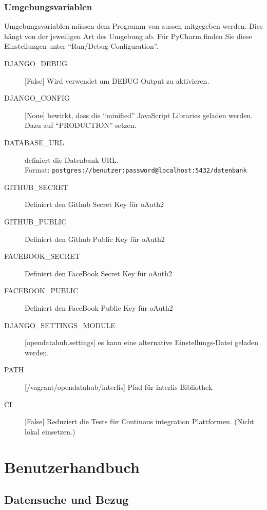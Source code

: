 \subsection{Umgebungsvariablen} \label{sec:sd:umgebungsvariablen}
Umgebungsvariablen müssen dem Programm von aussen mitgegeben werden. Dies hängt von der jeweiligen Art des Umgebung ab. Für PyCharm finden Sie diese Einstellungen unter ``Run/Debug Configuration''.


\begin{description}
\item[DJANGO\_DEBUG]{[}False{]} Wird verwendet um DEBUG Output zu aktivieren. 
\item[DJANGO\_CONFIG]{[}None{]} bewirkt, dass die ``minified'' JavaScript Libraries geladen werden. Dazu auf ``PRODUCTION'' setzen.
\item[DATABASE\_URL] definiert die Datenbank URL. \\Format: \texttt{postgres://benutzer:password@localhost:5432/datenbank}
\item[GITHUB\_SECRET] Definiert den Github Secret Key für oAuth2
\item[GITHUB\_PUBLIC] Definiert den Github Public Key für oAuth2
\item[FACEBOOK\_SECRET] Definiert den FaceBook Secret Key für oAuth2
\item[FACEBOOK\_PUBLIC] Definiert den FaceBook Public Key für oAuth2
\item[DJANGO\_SETTINGS\_MODULE]{[}opendatahub.settings{]} es kann eine alternative Einstellungs-Datei geladen werden.
\item[PATH]{[}/vagrant/opendatahub/interlis{]} Pfad für interlis Bibliothek
\item[CI]{[}False{]} Reduziert die Tests für Continous integration Plattformen. (Nicht lokal einsetzen.)
\end{description}
\chapter{Benutzerhandbuch}

\section{Datensuche und Bezug} \label{sec:sd:daten-suchen}

